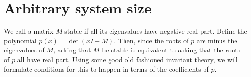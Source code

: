 \documentclass{amsart}
\theoremstyle{definition}
\theoremstyle{remark}
\numberwithin{equation}{section}
\begin{document}




\section{Arbitrary system size}
We call a matrix $M$ stable if all its eigenvalues have negative real
part.  Define the polynomial $p(x) = \det(xI + M)$.  Then, since the
roots of $p$ are minus the eigenvalues of $M$, asking that $M$ be
stable is equivalent to asking that the roots of $p$ all have real
part.  Using some good old fashioned invariant theory, we will
formulate conditions for this to happen in terms of the coefficients of
$p$.
\end{document}
